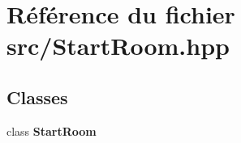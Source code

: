 \section{Référence du fichier src/\-Start\-Room.hpp}
\label{_start_room_8hpp}
\subsection*{Classes}
\begin{DoxyCompactItemize}
\item 
class {\bf Start\-Room}
\end{DoxyCompactItemize}
